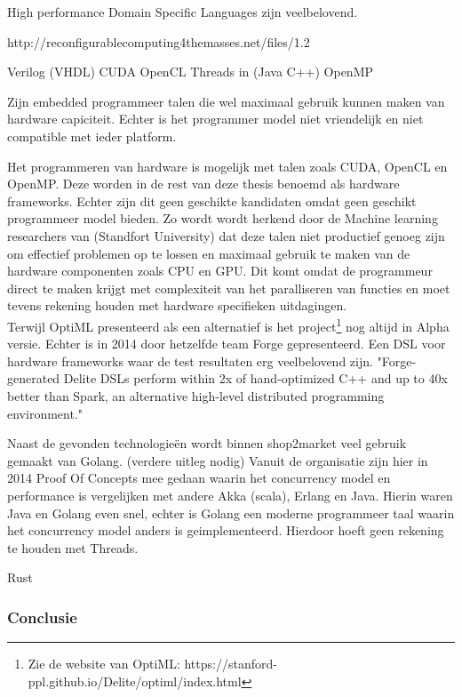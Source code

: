 High performance Domain Specific Languages zijn veelbelovend.

http://reconfigurablecomputing4themasses.net/files/1.2%

Verilog (VHDL)
CUDA
OpenCL
Threads in (Java C++)
OpenMP

Zijn embedded programmeer talen die wel maximaal gebruik kunnen maken van hardware capiciteit. Echter is het programmer model niet vriendelijk en niet compatible met ieder platform.



Het programmeren van hardware is mogelijk met talen zoals CUDA, OpenCL en OpenMP. Deze worden in de rest van deze thesis benoemd als hardware frameworks. Echter zijn dit geen geschikte kandidaten omdat geen geschikt programmeer model bieden. Zo wordt wordt herkend door de Machine learning researchers van (Standfort University) \cite{sujeeth2011optiml} dat deze talen niet productief genoeg zijn om effectief problemen op te lossen en maximaal gebruik te maken van de hardware componenten zoals CPU en GPU. Dit komt omdat de programmeur direct te maken krijgt met complexiteit van het paralliseren van functies en moet tevens rekening houden met hardware specifieken uitdagingen. \parencite{chafi2010language} \\

Terwijl \cite{sujeeth2011optiml} OptiML presenteerd als een alternatief is het project\footnote{Zie de website van OptiML: https://stanford-ppl.github.io/Delite/optiml/index.html} nog altijd in Alpha versie. Echter is in 2014 door hetzelfde team Forge gepresenteerd. Een DSL voor hardware frameworks waar de test resultaten erg veelbelovend zijn. "Forge-generated Delite DSLs perform within 2x of hand-optimized C++ and up to 40x better than Spark, an alternative high-level distributed programming environment." \parencite{sujeeth2014forge}


Naast de gevonden technologieën wordt binnen shop2market veel gebruik gemaakt van Golang. (verdere uitleg nodig)
Vanuit de organisatie zijn hier in 2014 Proof Of Concepts mee gedaan waarin het concurrency model en performance is vergelijken met andere Akka (scala), Erlang en Java. Hierin waren Java en Golang even snel, echter is Golang een moderne programmeer taal waarin het concurrency model anders is geimplementeerd. Hierdoor hoeft geen rekening te houden met Threads.

Rust

\subsubsection{Conclusie}

